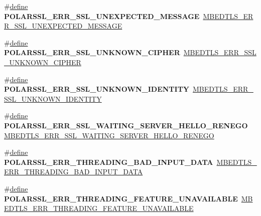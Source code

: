 \begin{DoxyCompactItemize}
\#\hyperlink{structdefine}{define} {\bfseries P\+O\+L\+A\+R\+S\+S\+L\+\_\+\+E\+R\+R\+\_\+\+S\+S\+L\+\_\+\+U\+N\+E\+X\+P\+E\+C\+T\+E\+D\+\_\+\+M\+E\+S\+S\+A\+GE}~\hyperlink{ssl_8h_ada7521232ac79a0cc64e8f5325fc7574}{M\+B\+E\+D\+T\+L\+S\+\_\+\+E\+R\+R\+\_\+\+S\+S\+L\+\_\+\+U\+N\+E\+X\+P\+E\+C\+T\+E\+D\+\_\+\+M\+E\+S\+S\+A\+GE}
\item 
\mbox{\label{compat-1_83_8h_aa719a34cc90e8d15dbface25b41e88db}} 
\#\hyperlink{structdefine}{define} {\bfseries P\+O\+L\+A\+R\+S\+S\+L\+\_\+\+E\+R\+R\+\_\+\+S\+S\+L\+\_\+\+U\+N\+K\+N\+O\+W\+N\+\_\+\+C\+I\+P\+H\+ER}~\hyperlink{ssl_8h_ac9df50cb6b7d5f0d3507a6bf8405adfe}{M\+B\+E\+D\+T\+L\+S\+\_\+\+E\+R\+R\+\_\+\+S\+S\+L\+\_\+\+U\+N\+K\+N\+O\+W\+N\+\_\+\+C\+I\+P\+H\+ER}
\item 
\mbox{\label{compat-1_83_8h_a5a52f3f1ee73e9c928003800909fef95}} 
\#\hyperlink{structdefine}{define} {\bfseries P\+O\+L\+A\+R\+S\+S\+L\+\_\+\+E\+R\+R\+\_\+\+S\+S\+L\+\_\+\+U\+N\+K\+N\+O\+W\+N\+\_\+\+I\+D\+E\+N\+T\+I\+TY}~\hyperlink{ssl_8h_adf3630ee46adcea979db9519225d0519}{M\+B\+E\+D\+T\+L\+S\+\_\+\+E\+R\+R\+\_\+\+S\+S\+L\+\_\+\+U\+N\+K\+N\+O\+W\+N\+\_\+\+I\+D\+E\+N\+T\+I\+TY}
\item 
\mbox{\label{compat-1_83_8h_a93189c5d341b4b5cc3718f53ae7d646e}} 
\#\hyperlink{structdefine}{define} {\bfseries P\+O\+L\+A\+R\+S\+S\+L\+\_\+\+E\+R\+R\+\_\+\+S\+S\+L\+\_\+\+W\+A\+I\+T\+I\+N\+G\+\_\+\+S\+E\+R\+V\+E\+R\+\_\+\+H\+E\+L\+L\+O\+\_\+\+R\+E\+N\+E\+GO}~\hyperlink{ssl_8h_adbadeb512c769067a5dbe1de97a85ad5}{M\+B\+E\+D\+T\+L\+S\+\_\+\+E\+R\+R\+\_\+\+S\+S\+L\+\_\+\+W\+A\+I\+T\+I\+N\+G\+\_\+\+S\+E\+R\+V\+E\+R\+\_\+\+H\+E\+L\+L\+O\+\_\+\+R\+E\+N\+E\+GO}
\item 
\mbox{\label{compat-1_83_8h_a0e208074a998f6ab35e6fc475dce82a0}} 
\#\hyperlink{structdefine}{define} {\bfseries P\+O\+L\+A\+R\+S\+S\+L\+\_\+\+E\+R\+R\+\_\+\+T\+H\+R\+E\+A\+D\+I\+N\+G\+\_\+\+B\+A\+D\+\_\+\+I\+N\+P\+U\+T\+\_\+\+D\+A\+TA}~\hyperlink{threading_8h_a76cd79a1ed3fd583ed3a4428d6a1e967}{M\+B\+E\+D\+T\+L\+S\+\_\+\+E\+R\+R\+\_\+\+T\+H\+R\+E\+A\+D\+I\+N\+G\+\_\+\+B\+A\+D\+\_\+\+I\+N\+P\+U\+T\+\_\+\+D\+A\+TA}
\item 
\mbox{\label{compat-1_83_8h_a303fd054cffb4960922186d69989d8d2}} 
\#\hyperlink{structdefine}{define} {\bfseries P\+O\+L\+A\+R\+S\+S\+L\+\_\+\+E\+R\+R\+\_\+\+T\+H\+R\+E\+A\+D\+I\+N\+G\+\_\+\+F\+E\+A\+T\+U\+R\+E\+\_\+\+U\+N\+A\+V\+A\+I\+L\+A\+B\+LE}~\hyperlink{threading_8h_ad3cbda6bbb5ce837b33ada893d7d5613}{M\+B\+E\+D\+T\+L\+S\+\_\+\+E\+R\+R\+\_\+\+T\+H\+R\+E\+A\+D\+I\+N\+G\+\_\+\+F\+E\+A\+T\+U\+R\+E\+\_\+\+U\+N\+A\+V\+A\+I\+L\+A\+B\+LE}

\end{DoxyCompactItemize}
